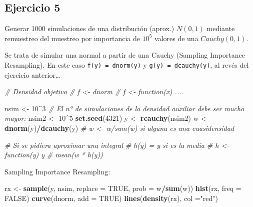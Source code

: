 \documentclass[]{book}
\newenvironment{Shaded}{\begin{snugshade}}{\end{snugshade}}
\newcommand{\KeywordTok}[1]{\textcolor[rgb]{0.13,0.29,0.53}{\textbf{#1}}}
\newcommand{\DataTypeTok}[1]{\textcolor[rgb]{0.13,0.29,0.53}{#1}}
\newcommand{\DecValTok}[1]{\textcolor[rgb]{0.00,0.00,0.81}{#1}}
\newcommand{\StringTok}[1]{\textcolor[rgb]{0.31,0.60,0.02}{#1}}
\newcommand{\CommentTok}[1]{\textcolor[rgb]{0.56,0.35,0.01}{\textit{#1}}}
\newcommand{\OtherTok}[1]{\textcolor[rgb]{0.56,0.35,0.01}{#1}}
\newcommand{\OperatorTok}[1]{\textcolor[rgb]{0.81,0.36,0.00}{\textbf{#1}}}
\newcommand{\NormalTok}[1]{#1}
\theoremstyle{definition}
\theoremstyle{definition}
\theoremstyle{definition}
\theoremstyle{remark}
\begin{document}
\subsection{Ejercicio 5}\label{ejercicio-5}

Generar 1000 simulaciones de una distribución (aprox.) \(N(0,1)\)
mediante remuestreo del muestreo por importancia de \(10^{5}\) valores
de una \(Cauchy(0,1)\).

Se trata de simular una normal a partir de una Cauchy (Sampling
Importance Resampling). En este caso \texttt{f(y)\ =\ dnorm(y)} y
\texttt{g(y)\ =\ dcauchy(y)}, al revés del ejercicio anterior\ldots{}

\begin{Shaded}
\begin{Highlighting}[]
\CommentTok{# Densidad objetivo}
\CommentTok{# f <- dnorm # f <- function(x) ....}

\NormalTok{nsim <-}\StringTok{ }\DecValTok{10}\OperatorTok{^}\DecValTok{3}
\CommentTok{# El nº de simulaciones de la densidad auxiliar debe ser mucho mayor:}
\NormalTok{nsim2 <-}\StringTok{ }\DecValTok{10}\OperatorTok{^}\DecValTok{5}
\KeywordTok{set.seed}\NormalTok{(}\DecValTok{4321}\NormalTok{)}
\NormalTok{y <-}\StringTok{ }\KeywordTok{rcauchy}\NormalTok{(nsim2)}
\NormalTok{w <-}\StringTok{ }\KeywordTok{dnorm}\NormalTok{(y)}\OperatorTok{/}\KeywordTok{dcauchy}\NormalTok{(y) }\CommentTok{# w <- w/sum(w) si alguna es una cuasidensidad}

\CommentTok{# Si se pidiera aproximar una integral}
\CommentTok{# h(y) = y si es la media # h <- function(y) y}
\CommentTok{# mean(w * h(y))}
\end{Highlighting}
\end{Shaded}

Sampling Importance Resampling:

\begin{Shaded}
\begin{Highlighting}[]
\NormalTok{rx <-}\StringTok{ }\KeywordTok{sample}\NormalTok{(y, nsim, }\DataTypeTok{replace =} \OtherTok{TRUE}\NormalTok{, }\DataTypeTok{prob =}\NormalTok{ w}\OperatorTok{/}\KeywordTok{sum}\NormalTok{(w))}
\KeywordTok{hist}\NormalTok{(rx, }\DataTypeTok{freq =} \OtherTok{FALSE}\NormalTok{)}
\KeywordTok{curve}\NormalTok{(dnorm, }\DataTypeTok{add =} \OtherTok{TRUE}\NormalTok{)}
\KeywordTok{lines}\NormalTok{(}\KeywordTok{density}\NormalTok{(rx), }\DataTypeTok{col =}\StringTok{"red"}\NormalTok{)}
\end{Highlighting}
\end{Shaded}
\end{document}
